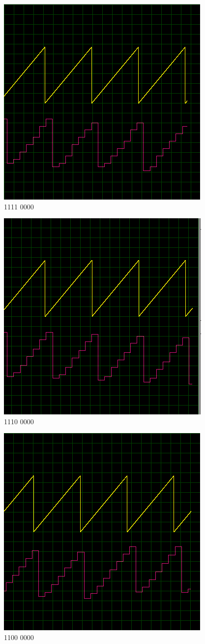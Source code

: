 \begin{multicols}{2}
\begin{figure}[H]
\centering
\includegraphics[width=0.5\linewidth]{ImagenesEjercicio1/bit4.png}
\caption{1111 0000}
\end{figure}
\begin{figure}[H]
\centering
\includegraphics[width=0.5\linewidth]{ImagenesEjercicio1/bit5.png}
\caption{1110 0000}
\end{figure}
\begin{figure}[H]
\centering
\includegraphics[width=0.5\linewidth]{ImagenesEjercicio1/bit6.png}
\caption{1100 0000}
\end{figure}
\begin{figure}[H]

\end{figure}
\end{multicols}
